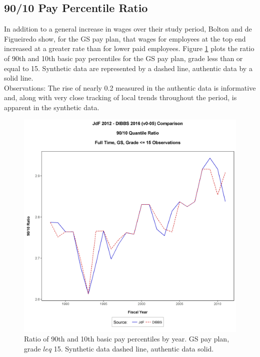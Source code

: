 \documentclass[10pt, letterpaper]{article}
\begin{document}
\begin{spacing}{1.0}
\clearpage

\subsection{90/10 Pay Percentile Ratio}

In addition to a general increase in wages over their study period, Bolton and de Figueiredo show, for the GS pay plan, that wages for employees at the top end increased at a greater rate than for lower paid employees.  Figure \ref{figure:BasicPayQuantile9010Ratio} plots the ratio of 90th and 10th basic pay percentiles for the GS pay plan, grade less than or equal to 15.  Synthetic data are represented by a dashed line, authentic data by a solid line.\\

Observations:  The rise of nearly 0.2 measured in the authentic data is informative and, along with very close tracking of local trends throughout the period, is apparent in the synthetic data.\\

\vspace{12pt}

\begin{figure}[h]
    \centering
    \includegraphics[width=6in, trim={0 0.6in 0 1in}, clip]{BasicPayQuantile9010Ratio.png}
    \caption{Ratio of 90th and 10th basic pay percentiles by year.  GS pay plan, grade $leq$ 15.  Synthetic data dashed line, authentic data solid.}
    \label{figure:BasicPayQuantile9010Ratio}
\end{figure}


\end{spacing}
\end{document}
